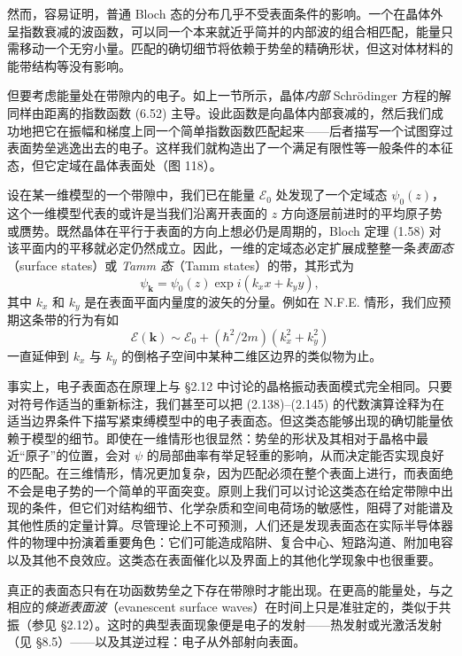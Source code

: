 然而，容易证明，普通 Bloch 态的分布几乎不受表面条件的影响。一个在晶体外呈指数衰减的波函数，可以同一个本来就近乎简并的内部波的组合相匹配，能量只需移动一个无穷小量。匹配的确切细节将依赖于势垒的精确形状，但这对体材料的能带结构等没有影响。

但要考虑能量处在带隙内的电子。如上一节所示，晶体\emph{内部} Schrödinger 方程的解同样由距离的指数函数 (6.52) 主导。设此函数是向晶体内部衰减的，然后我们成功地把它在振幅和梯度上同一个简单指数函数匹配起来——后者描写一个试图穿过表面势垒逃逸出去的电子。这样我们就构造出了一个满足有限性等一般条件的本征态，但它定域在晶体表面处（图 118）。


设在某一维模型的一个带隙中，我们已在能量 $\mathcal{E}_{0}$ 处发现了一个定域态 $\psi_{0}(z)$，这个一维模型代表的或许是当我们沿离开表面的 $z$ 方向逐层前进时的平均原子势或赝势。既然晶体在平行于表面的方向上想必仍是周期的，Bloch 定理 (1.58) 对该平面内的平移就必定仍然成立。因此，一维的定域态必定扩展成整整一条\emph{表面态}（surface states）或 \emph{Tamm 态}（Tamm states）的带，其形式为
\begin{equation*}
\psi_{\mathbf{k}}=\psi_{0}(z)\exp i(k_{x}x+k_{y}y), \tag{6.66}
\end{equation*}
其中 $k_{x}$ 和 $k_{y}$ 是在表面平面内量度的波矢的分量。例如在 N.F.E. 情形，我们应预期这条带的行为有如
\begin{equation*}
\mathcal{E}(\mathbf{k})\sim\mathcal{E}_{0}+(\hbar^{2}/2m)(k_{x}^{2}+k_{y}^{2}) \tag{6.67}
\end{equation*}
一直延伸到 $k_{x}$ 与 $k_{y}$ 的倒格子空间中某种二维区边界的类似物为止。

事实上，电子表面态在原理上与 §2.12 中讨论的晶格振动表面模式完全相同。只要对符号作适当的重新标注，我们甚至可以把 (2.138)–(2.145) 的代数演算诠释为在适当边界条件下描写紧束缚模型中的电子表面态。但这类态能够出现的确切能量依赖于模型的细节。即使在一维情形也很显然：势垒的形状及其相对于晶格中最近“原子”的位置，会对 $\psi$ 的局部曲率有举足轻重的影响，从而决定能否实现良好的匹配。在三维情形，情况更加复杂，因为匹配必须在整个表面上进行，而表面绝不会是电子势的一个简单的平面突变。原则上我们可以讨论这类态在给定带隙中出现的条件，但它们对结构细节、化学杂质和空间电荷场的敏感性，阻碍了对能谱及其他性质的定量计算。尽管理论上不可预测，人们还是发现表面态在实际半导体器件的物理中扮演着重要角色：它们可能造成陷阱、复合中心、短路沟道、附加电容以及其他不良效应。这类态在表面催化以及界面上的其他化学现象中也很重要。

真正的表面态只有在功函数势垒之下存在带隙时才能出现。在更高的能量处，与之相应的\emph{倏逝表面波}（evanescent surface waves）在时间上只是准驻定的，类似于共振（参见 §2.12）。这时的典型表面现象便是电子的发射——热发射或光激活发射（见 §8.5）——以及其逆过程：电子从外部射向表面。

